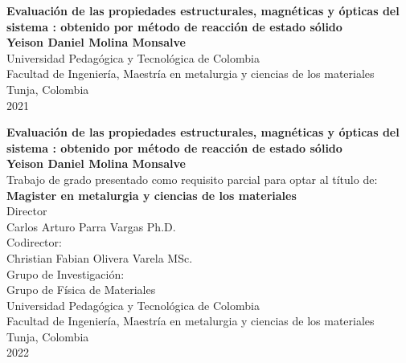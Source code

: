\begin{center}
    \begin{figure}
        \centering%

    \end{figure}
    \thispagestyle{empty} \vspace*{0.5cm} \textbf{\huge
    Evaluación de las propiedades estructurales, magnéticas y ópticas del
    sistema
    : obtenido por método de
    reacción de
    estado sólido}\\[4cm]
    \Large\textbf{Yeison Daniel Molina Monsalve}\\[4cm]
    \small Universidad Pedagógica y Tecnológica de Colombia\\
    Facultad de Ingeniería, Maestría en metalurgia y ciencias de los
    materiales\\
    Tunja, Colombia\\
    2021\\
\end{center}

\newpage{\pagestyle{empty}}%

\newpage
\begin{center}
    \thispagestyle{empty} \vspace*{0cm} \textbf{\huge
    Evaluación de las propiedades estructurales, magnéticas y ópticas del
    sistema
    : obtenido por método de
    reacción de
    estado sólido}\\[1.1cm]
    \Large\textbf{Yeison Daniel Molina Monsalve}\\[1.1cm]
    \small Trabajo de grado presentado como requisito parcial para
    optar
    al
    título de:\\
    \textbf{Magister en metalurgia y ciencias de los materiales}\\[1.1cm]
    Director\\
    Carlos Arturo Parra Vargas Ph.D.\\[0.5cm]
    Codirector:\\
    Christian Fabian Olivera Varela MSc.\\[1.1cm]
    Grupo de Investigación:\\
    Grupo de Física de Materiales\\[1.1cm]
    Universidad Pedagógica y Tecnológica de Colombia\\
    Facultad de Ingeniería, Maestría en metalurgia y ciencias de los
    materiales\\
    Tunja, Colombia\\
    2022\\
\end{center}

